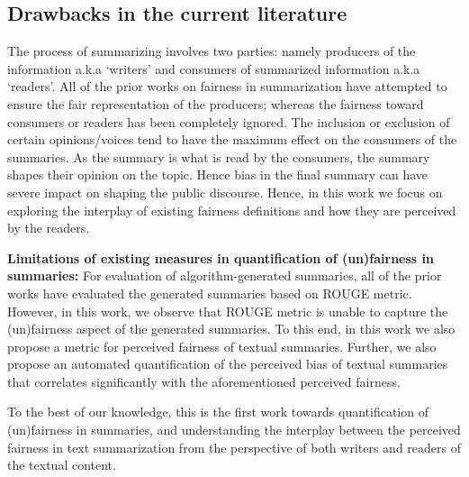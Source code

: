 \subsection{Drawbacks in the current literature}
\noindent
The process of summarizing involves two parties: namely producers of the information a.k.a `writers' and consumers of summarized information a.k.a `readers'. All of the prior works on fairness in summarization have attempted to ensure the fair representation of the producers; whereas the fairness toward consumers or readers has been completely ignored. 
The inclusion or exclusion of certain opinions/voices tend to have the maximum effect on the consumers of the summaries. As the summary is what is read by the consumers, the summary shapes their opinion on the topic. Hence bias in the final summary can have severe impact on shaping the public discourse. Hence, in this work we focus on exploring the interplay of existing fairness definitions and how they are perceived by the readers.

\vspace{2mm}
\noindent
\textbf{Limitations of existing measures in quantification of (un)fairness in summaries:} For evaluation of algorithm-generated summaries, all of the prior works have evaluated the generated summaries based on ROUGE metric. However, in this work, we observe that ROUGE metric is unable to capture the (un)fairness aspect of the generated summaries. 
To this end, in this work we also propose a metric for perceived fairness of textual summaries. Further, we also propose an automated quantification of the perceived bias of textual summaries that correlates significantly with the aforementioned perceived fairness. 

To the best of our knowledge, this is the first work towards quantification of (un)fairness in summaries, and understanding the interplay between the perceived fairness in text summarization from the perspective of both writers and readers of the textual content. 


